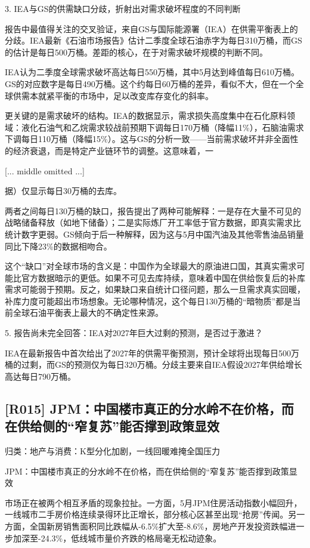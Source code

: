 \documentclass[11pt]{ctexart}
\begin{document}
3. IEA与GS的供需缺口分歧，折射出对需求破坏程度的不同判断

报告中最值得关注的交叉验证，来自GS与国际能源署（IEA）在供需平衡表上的分歧。IEA最新《石油市场报告》估计二季度全球石油赤字为每日310万桶，而GS的估计是每日500万桶。差距的核心，在于对需求破坏规模的判断不同。

IEA认为二季度全球需求破坏高达每日550万桶，其中5月达到峰值每日610万桶。GS的对应数字是每日490万桶。这个约每日60万桶的差异，看似不大，但在一个全球供需本就紧平衡的市场中，足以改变库存变化的斜率。

更关键的是需求破坏的结构。IEA的数据显示，需求损失高度集中在石化原料领域：液化石油气和乙烷需求较战前预期下调每日170万桶（降幅11\%），石脑油需求下调每日110万桶（降幅15\%）。这与GS的分析一致——当前需求破坏并非全面性的经济衰退，而是特定产业链环节的调整。这意味着，一

[... middle omitted ...]

据）仅显示每日30万桶的去库。

两者之间每日130万桶的缺口，报告提出了两种可能解释：一是存在大量不可见的战略储备释放（如地下储备）；二是实际炼厂开工率低于官方数据，即真实需求比统计数字更弱。GS倾向于后一种解释，因为这与5月中国汽油及其他零售油品销量同比下降23\%的数据相吻合。

这个“缺口”对全球市场的含义是：中国作为全球最大的原油进口国，其真实需求可能比官方数据暗示的更低。如果不可见去库持续，意味着中国在供给恢复后的补库需求可能弱于预期。反之，如果缺口来自统计口径问题，那么一旦需求真实回暖，补库力度可能超出市场想象。无论哪种情况，这个每日130万桶的“暗物质”都是当前全球石油平衡表上最大的不确定性来源。

5. 报告尚未完全回答：IEA对2027年巨大过剩的预测，是否过于激进？

IEA在最新报告中首次给出了2027年的供需平衡预测，预计全球将出现每日500万桶的过剩，而GS的预测仅为每日320万桶。分歧主要来自IEA假设2027年供给增长高达每日790万桶。

\subsection{[R015] JPM：中国楼市真正的分水岭不在价格，而在供给侧的“窄复苏”能否撑到政策显效}
{\small\color{refgray}归类：地产与消费：K型分化加剧，一线回暖难掩全国压力}

JPM：中国楼市真正的分水岭不在价格，而在供给侧的“窄复苏”能否撑到政策显效

市场正在被两个相互矛盾的现象拉扯。一方面，5月JPM住房活动指数小幅回升，一线城市二手房价格连续录得环比正增长，部分核心区甚至出现“抢房”传闻。另一方面，全国新房销售面积同比跌幅从-6.5\%扩大至-8.6\%，房地产开发投资跌幅进一步加深至-24.3\%，低线城市量价齐跌的格局毫无松动迹象。
\end{document}
